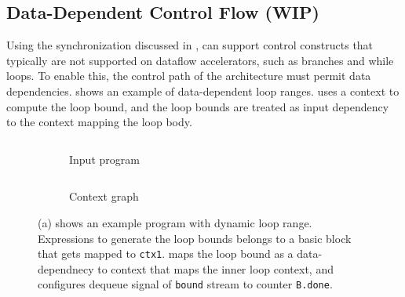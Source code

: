 \subsection{Data-Dependent Control Flow (WIP)}
Using the synchronization discussed in , \name can support control constructs that 
typically are not supported on dataflow accelerators, such as branches and while loops.
To enable this, the control path of the architecture must permit data dependencies.
 shows an example of data-dependent loop ranges. \name uses a context to compute
the loop bound, and the loop bounds are treated as input dependency to the context mapping the loop
body.
\begin{figure}
\centering
\begin{subfigure}[b]{0.4\textwidth}
\inputminted{python}{code/dynrange.py}
\caption{Input program}
\end{subfigure}
\hfill
\begin{subfigure}[b]{0.5\textwidth}
\inputminted{python}{code/dynrangectx.py}
\caption{Context graph}
\end{subfigure}
\caption[Example of dynamic loop range]{
  (a) shows an example program with dynamic loop range. 
  Expressions to generate the loop bounds belongs to a basic block that gets mapped to \texttt{ctx1}.
  \name maps the loop bound as a data-dependnecy to context that maps the inner loop context, and
  configures dequeue signal of \texttt{bound} stream to counter \texttt{B.done}.
}
\label{fig:dynrange}
\end{figure}

